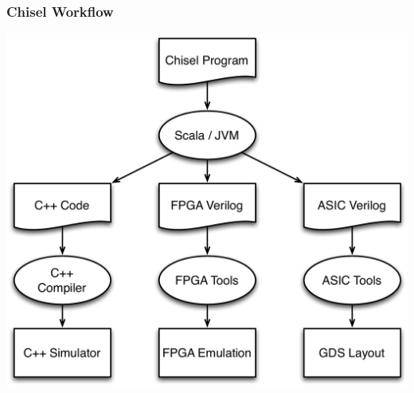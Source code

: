 \documentclass[xcolor=pdflatex,dvipsnames,table]{beamer}
\begin{document}
\begin{frame}
\frametitle{Chisel Workflow}
\begin{center}
\includegraphics[height=0.9\textheight]{figs/workflow.pdf}
\end{center}

\end{frame}
\end{document}
